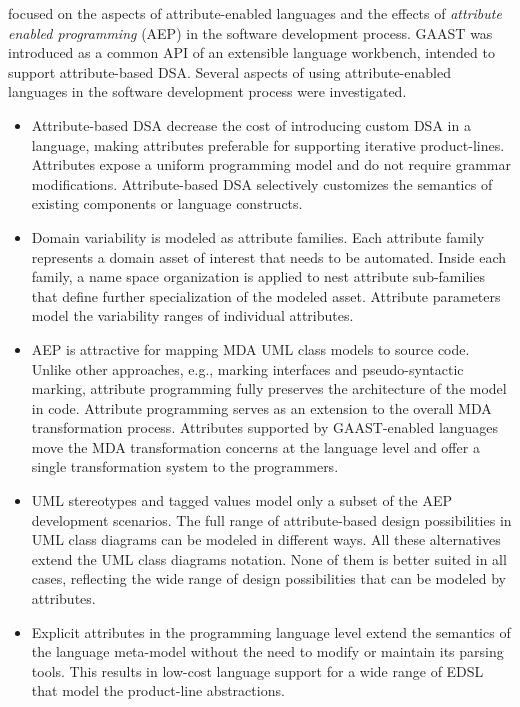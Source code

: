 \noindent \textbf{} focused on the aspects of attribute-enabled languages and the effects of \textit{attribute enabled programming} (AEP) in the software development process. GAAST was introduced as a common API of an extensible language workbench, intended to support attribute-based DSA. Several aspects of using attribute-enabled languages in the software development process were investigated.

\begin{itemize}

\item Attribute-based DSA decrease the cost of introducing custom DSA in a language, making attributes preferable for supporting iterative product-lines. Attributes expose a uniform programming model and do not require grammar modifications. Attribute-based DSA selectively customizes the semantics of existing components or language constructs.

\item Domain variability is modeled as attribute families. Each attribute family represents a domain asset of interest that needs to be automated. Inside each family, a name space organization is applied to nest attribute sub-families that define further specialization of the modeled asset. Attribute parameters model the variability ranges of individual attributes.

\item AEP is attractive for mapping MDA UML class models to source code. Unlike other approaches, e.g., marking interfaces and pseudo-syntactic marking, attribute programming fully preserves the architecture of the model in code. Attribute programming serves as an extension to the overall MDA transformation process. Attributes supported by GAAST-enabled languages move the MDA transformation concerns at the language level and offer a single transformation system to the programmers.

\item UML stereotypes and tagged values model only a subset of the AEP development scenarios. The full range of attribute-based design possibilities in UML class diagrams can be modeled in different ways. All these alternatives extend the UML class diagrams notation. None of them is better suited in all cases, reflecting the wide range of design possibilities that can be modeled by attributes.

\item Explicit attributes in the programming language level extend the semantics of the language meta-model without the need to modify or maintain its parsing tools. This results in low-cost language support for a wide range of EDSL that model the product-line abstractions.


\end{itemize}
